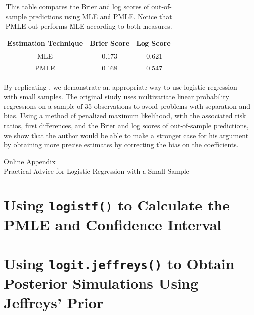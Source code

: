 \documentclass[12pt]{article}
\begin{document}
\singlespace
\begin{table}[H]
\begin{center}
\begin{tabular}{| c | c | c |}
\hline
Estimation Technique & Brier Score & Log Score \\
\hline
MLE & 0.173 & -0.621 \\
PMLE & 0.168 & -0.547 \\
\hline
\end{tabular}\caption{This table compares the Brier and log scores of out-of-sample predictions using MLE and PMLE. Notice that PMLE out-performs MLE according to both measures.}\label{tab:scores}
\end{center}
\end{table}
\doublespace

By replicating \citet{Weisiger2014}, we demonstrate an appropriate way to use logistic regression with small samples. The original study uses multivariate linear probability regressions on a sample of 35 observations to avoid problems with separation and bias. Using a method of penalized maximum likelihood, with the associated risk ratios, first differences, and the Brier and log scores of out-of-sample predictions, we show that the author would be able to make a stronger case for his argument by obtaining more precise estimates by correcting the bias on the coefficients.

\singlespace 
\newpage
\normalsize


%

\newpage
\begin{appendix}
\begin{center}
{\LARGE Online Appendix}\\
{\large Practical Advice for Logistic Regression with a Small Sample}\\\vspace{2mm}
\end{center}


\section{Using \texttt{logistf()} to Calculate the PMLE and Confidence Interval}

\section{Using \texttt{logit.jeffreys()} to Obtain Posterior Simulations Using Jeffreys' Prior}

\end{appendix}
\end{document}
